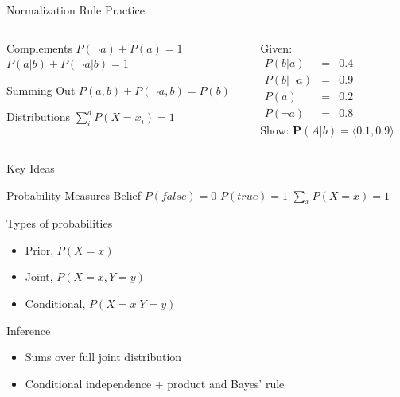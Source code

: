 \documentclass[14pt]{beamer}
\begin{document}
\begin{frame}{Normalization Rule Practice}
	\begin{columns}
		\begin{column}{2in}
			\begin{block}{Complements}
				$P(\lnot a) + P(a) = 1$ \\
				$P(a|b) + P(\lnot a|b) = 1$
			\end{block}
			\begin{block}{Summing Out}
				$P(a, b) + P(\lnot a, b) = P(b)$
			\end{block}
			\begin{block}{Distributions}
				$\sum\limits^{d}_{i}{P(X=x_{i})} = 1$
			\end{block}
		\end{column}
		\begin{column}{2.4in}
			\small
			Given:
			\\ \smallskip
			$
			\begin{array}{lll}
				P(b|a)       & = & 0.4 \\
				P(b|\lnot a) & = & 0.9 \\
				P(a)         & = & 0.2 \\
				P(\lnot a)   & = & 0.8
			\end{array}
			$
			\\ \bigskip
			Show: $\mathbf{P}(A|b) = \langle 0.1, 0.9 \rangle$
		\end{column}
	\end{columns}
\end{frame}
\begin{frame}{Key Ideas}
	\begin{block}{Probability Measures Belief}
		$P(\textit{false}) = 0$ \tab $P(\textit{true}) = 1$ \tab\tab\tab $\sum\limits_{x}P(X\!=\!x) = 1$
	\end{block}
	\begin{block}{Types of probabilities}
		\begin{itemize}
			\item Prior, $P(X\!=\!x)$
			\item Joint, $P(X\!=\!x,Y\!=\!y)$
			\item Conditional, $P(X\!=\!x|Y\!=\!y)$
		\end{itemize}
	\end{block}
	\begin{block}{Inference}
		\begin{itemize}
			\item Sums over full joint distribution
			\item Conditional independence + product and Bayes' rule
		\end{itemize}
	\end{block}
\end{frame}
\end{document}

